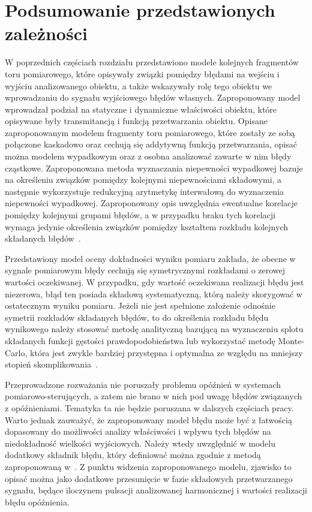 \section{Podsumowanie przedstawionych zależności}

W poprzednich częściach rozdziału przedstawiono modele kolejnych fragmentów toru pomiarowego, które opisywały związki pomiędzy błędami na wejściu i wyjściu analizowanego obiektu, a także wskazywały rolę tego obiektu we wprowadzaniu do sygnału wyjściowego błędów własnych. Zaproponowany model wprowadzał podział na statyczne i dynamiczne właściwości obiektu, które opisywane były transmitancją i funkcją przetwarzania obiektu. Opisane zaproponowanym modelem fragmenty toru pomiarowego, które zostały ze sobą połączone kaskadowo oraz cechują się addytywną funkcją przetwarzania, opisać można modelem wypadkowym oraz z osobna analizować zawarte w nim błędy cząstkowe. Zaproponowana metoda wyznaczania niepewności wypadkowej bazuje na określeniu związków pomiędzy kolejnymi niepewnościami składowymi, a następnie wykorzystuje redukcyjną arytmetykę interwałową do wyznaczenia niepewności wypadkowej. Zaproponowany opis uwzględnia ewentualne korelacje pomiędzy kolejnymi grupami błędów, a w przypadku braku tych korelacji wymaga jedynie określenia związków pomiędzy kształtem rozkładu kolejnych składanych błędów~\cite{jakubiec_reductive, batko_uncertainty}.

Przedstawiony model oceny dokładności wyniku pomiaru zakłada, że obecne w sygnale pomiarowym błędy cechują się symetrycznymi rozkładami o zerowej wartości oczekiwanej. W przypadku, gdy wartość oczekiwana realizacji błędu jest niezerowa, błąd ten posiada składową systematyczną, którą należy skorygować w ostatecznym wyniku pomiaru. Jeżeli nie jest spełnione założenie odnośnie symetrii rozkładów składanych błędów, to do określenia rozkładu błędu wynikowego należy stosować metodę analityczną bazującą na wyznaczeniu splotu składanych funkcji gęstości prawdopodobieństwa lub wykorzystać metodę Monte-Carlo, która jest zwykle bardziej przystępna i optymalna ze względu na mniejszy stopień skomplikowania~\cite{janssen_montecarlo, roj_annuncertainty}.

Przeprowadzone rozważania nie poruszały problemu opóźnień w systemach pomiarowo-sterujących, a zatem nie brano w nich pod uwagę błędów związanych z opóźnieniami. Tematyka ta nie będzie poruszana w dalszych częściach pracy. Warto jednak zauważyć, że zaproponowany model błędu może być z łatwością dopasowany do możliwości analizy właściwości i wpływu tych błędów na niedokładność wielkości wyjściowych. Należy wtedy uwzględnić w modelu dodatkowy składnik błędu, który definiować można zgodnie z metodą zaproponowaną w~\cite{wymyslo_delay, jakubiec_system}. Z punktu widzenia zaproponowanego modelu, zjawisko to opisać można jako dodatkowe przesunięcie w fazie składowych przetwarzanego sygnału, będące iloczynem pulsacji analizowanej harmonicznej i wartości realizacji błędu opóźnienia.
